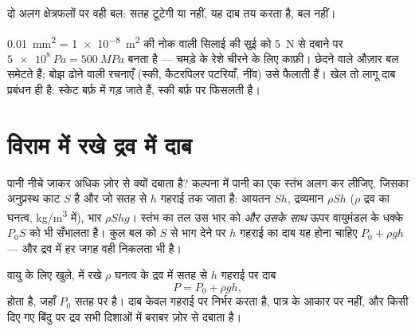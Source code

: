 \begin{omfigure}
\qquad
{}

{\small दो अलग क्षेत्रफलों पर वही बल: सतह टूटेगी या नहीं, यह
दाब तय करता है, बल नहीं।}
\end{omfigure}

\begin{remark}[समेटिए या फैलाइए]\label{rem:g10:pressure:tools}
\qty{0.01}{mm^2} = \qty{1e-8}{m^2} की नोक वाली सिलाई की सुई को \qty{5}{N} से दबाने पर $\qty{5e8}{Pa} = \qty{500}{MPa}$
बनता है --- चमड़े के रेशे चीरने के लिए काफ़ी। छेदने वाले औज़ार
बल समेटते हैं; बोझ ढोने वाली रचनाएँ (स्की, कैटरपिलर पटरियाँ,
नींव) उसे फैलाती हैं। खेल तो लागू दाब प्रबंधन ही है: स्केट बर्फ़
में गड़ जाते हैं, स्की बर्फ़ पर फिसलती है।
\end{remark}

\section{विराम में रखे द्रव में दाब}

पानी नीचे जाकर अधिक ज़ोर से क्यों दबाता है? कल्पना में पानी का एक
 स्तंभ अलग कर लीजिए, जिसका अनुप्रस्थ काट $S$ है और जो सतह से
$h$ गहराई तक जाता है: आयतन $Sh$, द्रव्यमान $\rho S h$ ($\rho$ द्रव का
घनत्व, \unit{kg/m^3} में), भार $\rho S h g$। स्तंभ का तल उस भार को
\emph{और उसके साथ} ऊपर वायुमंडल के धक्के $P_0 S$ को भी सँभालता है। कुल
बल को $S$ से भाग देने पर $h$ गहराई का दाब यह होना
चाहिए
$P_0 + \rho g h$ --- और द्रव में हर जगह वही निकलता भी है।

\begin{theorem}[गहराई पर दाब]\label{thm:g10:pressure:depth}
वायु के लिए खुले,  में रखे $\rho$ घनत्व के द्रव में सतह से $h$
गहराई पर दाब
\[
P = P_0 + \rho g h,
\]
होता है, जहाँ $P_0$ सतह पर  है। दाब केवल
गहराई पर निर्भर करता है, पात्र के आकार पर नहीं, और किसी दिए गए बिंदु पर
द्रव सभी दिशाओं में बराबर ज़ोर से दबाता है।
\end{theorem}
\admitted


